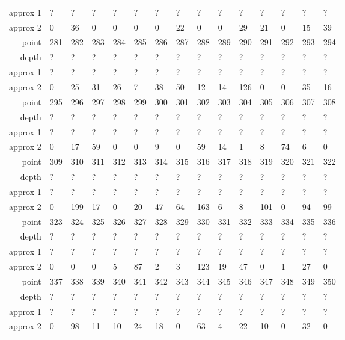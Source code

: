 \begin{center}
\begin{supertabular}{|r|l l l l l l l l l l l l l l|}
approx 1 & ? & ? & ? & ? & ? & ? & ? & ? & ? & ? & ? & ? & ? & ? \\
approx 2 & 0 & 36 & 0 & 0 & 0 & 0 & 22 & 0 & 0 & 29 & 21 & 0 & 15 & 39 \\
\hline
point & 281 & 282 & 283 & 284 & 285 & 286 & 287 & 288 & 289 & 290 & 291 & 292 & 293 & 294 \\
\hline
depth & ? & ? & ? & ? & ? & ? & ? & ? & ? & ? & ? & ? & ? & ? \\
approx 1 & ? & ? & ? & ? & ? & ? & ? & ? & ? & ? & ? & ? & ? & ? \\
approx 2 & 0 & 25 & 31 & 26 & 7 & 38 & 50 & 12 & 14 & 126 & 0 & 0 & 35 & 16 \\
\hline
point & 295 & 296 & 297 & 298 & 299 & 300 & 301 & 302 & 303 & 304 & 305 & 306 & 307 & 308 \\
\hline
depth & ? & ? & ? & ? & ? & ? & ? & ? & ? & ? & ? & ? & ? & ? \\
approx 1 & ? & ? & ? & ? & ? & ? & ? & ? & ? & ? & ? & ? & ? & ? \\
approx 2 & 0 & 17 & 59 & 0 & 0 & 9 & 0 & 59 & 14 & 1 & 8 & 74 & 6 & 0 \\
\hline
point & 309 & 310 & 311 & 312 & 313 & 314 & 315 & 316 & 317 & 318 & 319 & 320 & 321 & 322 \\
\hline
depth & ? & ? & ? & ? & ? & ? & ? & ? & ? & ? & ? & ? & ? & ? \\
approx 1 & ? & ? & ? & ? & ? & ? & ? & ? & ? & ? & ? & ? & ? & ? \\
approx 2 & 0 & 199 & 17 & 0 & 20 & 47 & 64 & 163 & 6 & 8 & 101 & 0 & 94 & 99 \\
\hline
point & 323 & 324 & 325 & 326 & 327 & 328 & 329 & 330 & 331 & 332 & 333 & 334 & 335 & 336 \\
\hline
depth & ? & ? & ? & ? & ? & ? & ? & ? & ? & ? & ? & ? & ? & ? \\
approx 1 & ? & ? & ? & ? & ? & ? & ? & ? & ? & ? & ? & ? & ? & ? \\
approx 2 & 0 & 0 & 0 & 5 & 87 & 2 & 3 & 123 & 19 & 47 & 0 & 1 & 27 & 0 \\
\hline
point & 337 & 338 & 339 & 340 & 341 & 342 & 343 & 344 & 345 & 346 & 347 & 348 & 349 & 350 \\
\hline
depth & ? & ? & ? & ? & ? & ? & ? & ? & ? & ? & ? & ? & ? & ? \\
approx 1 & ? & ? & ? & ? & ? & ? & ? & ? & ? & ? & ? & ? & ? & ? \\
approx 2 & 0 & 98 & 11 & 10 & 24 & 18 & 0 & 63 & 4 & 22 & 10 & 0 & 32 & 0 \\

\end{supertabular}
\end{center}
